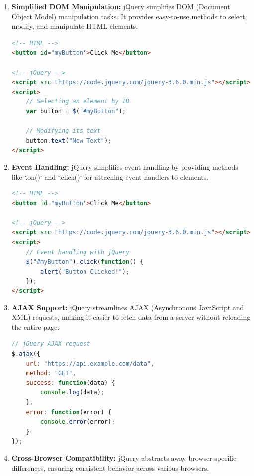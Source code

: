 \documentclass[11pt]{article}
\begin{document}
\begin{enumerate}

    \item \textbf{Simplified DOM Manipulation:} jQuery simplifies DOM (Document Object Model) manipulation tasks. It provides easy-to-use methods to select, modify, and manipulate HTML elements.

          \begin{lstlisting}[language=HTML, caption=Example: Selecting and Modifying Elements]
<!-- HTML -->
<button id="myButton">Click Me</button>

<!-- jQuery -->
<script src="https://code.jquery.com/jquery-3.6.0.min.js"></script>
<script>
    // Selecting an element by ID
    var button = $("#myButton");

    // Modifying its text
    button.text("New Text");
</script>
\end{lstlisting}

    \item \textbf{Event Handling:} jQuery simplifies event handling by providing methods like `.on()` and `.click()` for attaching event handlers to elements.

          \begin{lstlisting}[language=HTML, caption=Example: Event Handling]
<!-- HTML -->
<button id="myButton">Click Me</button>

<!-- jQuery -->
<script src="https://code.jquery.com/jquery-3.6.0.min.js"></script>
<script>
    // Event handling with jQuery
    $("#myButton").click(function() {
        alert("Button Clicked!");
    });
</script>
\end{lstlisting}

    \item \textbf{AJAX Support:} jQuery streamlines AJAX (Asynchronous JavaScript and XML) requests, making it easier to fetch data from a server without reloading the entire page.

          \begin{lstlisting}[language=JavaScript, caption=Example: AJAX Request]
// jQuery AJAX request
$.ajax({
    url: "https://api.example.com/data",
    method: "GET",
    success: function(data) {
        console.log(data);
    },
    error: function(error) {
        console.error(error);
    }
});
\end{lstlisting}

    \item \textbf{Cross-Browser Compatibility:} jQuery abstracts away browser-specific differences, ensuring consistent behavior across various browsers.


\end{enumerate}
\end{document}
